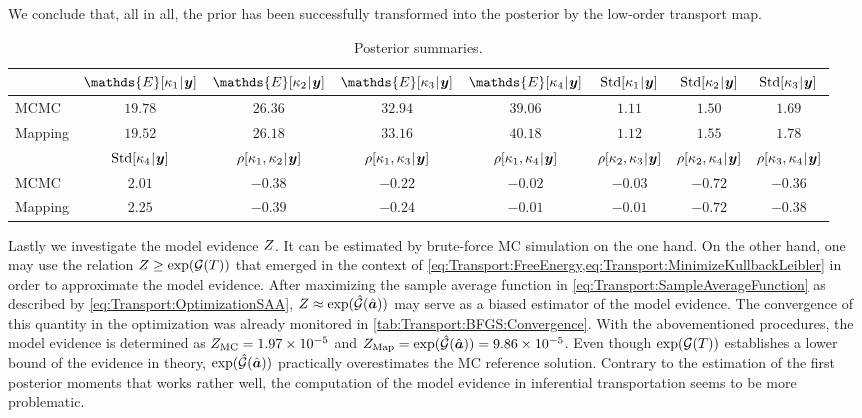 We conclude that, all in all, the prior has been successfully transformed into the posterior by the low-order transport map.
\begin{table}[htbp]
  \caption[Posterior summaries]{Posterior summaries.}
  \label{tab:Transport:Post:Summaries}
  \centering
  \begin{tabular}{lccccccc}
    \toprule
    & \(\mathds{E}[\kappa_1 \cond \bm{y}]\) & \(\mathds{E}[\kappa_2 \cond \bm{y}]\) & \(\mathds{E}[\kappa_3 \cond \bm{y}]\) & \(\mathds{E}[\kappa_4 \cond \bm{y}]\)
    & \(\mathrm{Std}[\kappa_1 {\:\!}|{\:\!} \bm{y}]\) & \(\mathrm{Std}[\kappa_2 {\:\!}|{\:\!} \bm{y}]\) & \(\mathrm{Std}[\kappa_3 {\:\!}|{\:\!} \bm{y}]\) \\
    \midrule
    MCMC    & \(19.78\) & \(26.36\) & \(32.94\) & \(39.06\) & \(1.11\) & \(1.50\) & \(1.69\) \\
    Mapping & \(19.52\) & \(26.18\) & \(33.16\) & \(40.18\) & \(1.12\) & \(1.55\) & \(1.78\) \\
    \midrule
    & \(\mathrm{Std}[\kappa_4 {\:\!}|{\:\!} \bm{y}]\) & \(\rho[\kappa_1,\kappa_2 {\:\!}|{\:\!} \bm{y}]\) & \(\rho[\kappa_1,\kappa_3 {\:\!}|{\:\!} \bm{y}]\) & \(\rho[\kappa_1,\kappa_4 {\:\!}|{\:\!} \bm{y}]\)
    & \(\rho[\kappa_2,\kappa_3 {\:\!}|{\:\!} \bm{y}]\) & \(\rho[\kappa_2,\kappa_4 {\:\!}|{\:\!} \bm{y}]\) & \(\rho[\kappa_3,\kappa_4 {\:\!}|{\:\!} \bm{y}]\) \\
    \midrule
    MCMC    & \(2.01\) & \(-0.38\) & \(-0.22\) & \(-0.02\) & \(-0.03\) & \(-0.72\) & \(-0.36\) \\
    Mapping & \(2.25\) & \(-0.39\) & \(-0.24\) & \(-0.01\) & \(-0.01\) & \(-0.72\) & \(-0.38\) \\
    \bottomrule
  \end{tabular}
\end{table}
\par %
Lastly we investigate the model evidence \(Z\).
It can be estimated by brute-force MC simulation on the one hand.
On the other hand, one may use the relation \(Z \geq \exp(\mathcal{G}(T))\) that emerged in the context of
\cref{eq:Transport:FreeEnergy,eq:Transport:MinimizeKullbackLeibler} in order to approximate the model evidence.
After maximizing the sample average function in \cref{eq:Transport:SampleAverageFunction} as described by \cref{eq:Transport:OptimizationSAA},
\(Z \approx \exp(\hat{\mathcal{G}}(\hat{\bm{a}}))\) may serve as a biased estimator of the model evidence.
The convergence of this quantity in the optimization was already monitored in \cref{tab:Transport:BFGS:Convergence}.
With the abovementioned procedures, the model evidence is determined as \(Z_{\mathrm{MC}} = 1.97 \times 10^{-5}\)
and \(Z_{\mathrm{Map}} = \exp(\hat{\mathcal{G}}(\hat{\bm{a}})) = 9.86 \times 10^{-5}\).
Even though \(\exp(\mathcal{G}(T))\) establishes a lower bound of the evidence in theory,
\(\exp(\hat{\mathcal{G}}(\hat{\bm{a}}))\) practically overestimates the MC reference solution.
Contrary to the estimation of the first posterior moments that works rather well, the computation of the model evidence in inferential transportation seems to be more problematic.